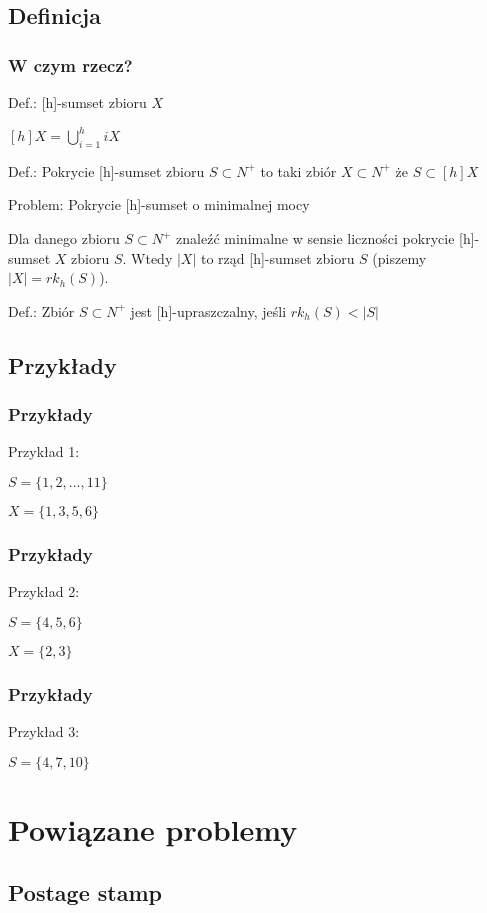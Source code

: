 \documentclass{beamer}
\begin{document}
	\subsection{Definicja}
		\begin{frame} \frametitle{W czym rzecz?}
			Def.: [h]-sumset zbioru $ X $
			
			$ [h]X = \bigcup_{i=1}^{h} iX $
			
			Def.: Pokrycie [h]-sumset zbioru $ S \subset N^{+} $ to taki zbiór $ X \subset N^{+} $ że $ S \subset [h]X $
			
			Problem: Pokrycie [h]-sumset o minimalnej mocy
			
			Dla danego zbioru $ S \subset N^{+} $ znaleźć minimalne w sensie liczności pokrycie [h]-sumset $ X $ zbioru $ S $. Wtedy $ |X| $ to rząd [h]-sumset zbioru $ S $ (piszemy $ |X| = rk_{h}(S) $).
			
			Def.: Zbiór $ S \subset N^{+} $ jest [h]-upraszczalny, jeśli $ rk_{h}(S) < |S| $
		\end{frame}
		
	\subsection{Przykłady}
		\begin{frame} \frametitle{Przykłady}
			Przykład 1:
			
			$ S = \lbrace 1,2,...,11 \rbrace $
			
			$ X = \lbrace 1,3,5,6 \rbrace $
		\end{frame}
			
		\begin{frame} \frametitle{Przykłady}
			Przykład 2:
			
			$ S = \lbrace 4,5,6 \rbrace $
			
			$ X = \lbrace 2,3 \rbrace $
		\end{frame}
		
		\begin{frame} \frametitle{Przykłady}		
			Przykład 3:
			
			$ S =  \lbrace 4,7,10 \rbrace $						
		\end{frame}
		
\section{Powiązane problemy}
	\subsection{Postage stamp}
		\begin{frame}
		\end{frame}
		
\end{document}
